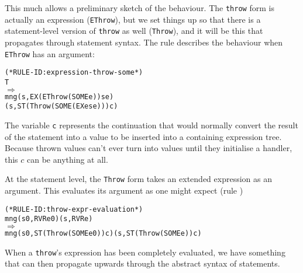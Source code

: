 \documentclass[11pt]{article}
\begin{document}
  This much
allows a preliminary sketch of the behaviour.  The \texttt{throw} form
is actually an expression (\texttt{EThrow}), but we set things up so
that there is a statement-level version of \texttt{throw} as well
(\texttt{Throw}), and it will be this that propagates through
statement syntax.  The rule  describes
the behaviour when \texttt{EThrow} has an argument:
\begin{center}
\begin{minipage}{\textwidth}
%
\begin{alltt}
(* RULE-ID: expression-throw-some *)
     T
   \(\Rightarrow\)
     mng (s, EX (EThrow (SOME e)) se)
         (s, ST (Throw (SOME (EX e se))) c)
\end{alltt}
\end{minipage}
\end{center}
The variable \texttt{c} represents the continuation that would
normally convert the result of the statement into a value to be
inserted into a containing expression tree.  Because thrown
values can't ever turn into values until they initialise a handler,
this $c$ can be anything at all.

At the statement level, the \texttt{Throw} form takes an extended
expression as an argument.  This evaluates its argument as one might
expect (rule )
\begin{center}
\begin{minipage}{\textwidth}
\begin{alltt}
(* RULE-ID: throw-expr-evaluation *)
     mng (s0, RVR e0) (s, RVR e)
   \(\Rightarrow\)
     mng (s0, ST (Throw (SOME e0)) c) (s, ST (Throw (SOME e)) c)
\end{alltt}
\end{minipage}
\end{center}

When a \texttt{throw}'s expression has been completely evaluated, we
have something that can then propagate upwards through the abstract
syntax of statements.
\end{document}
